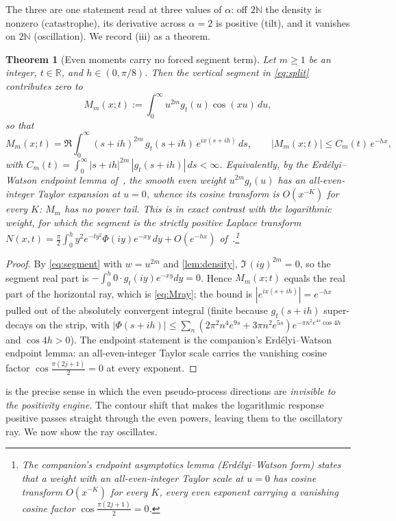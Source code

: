 \documentclass[11pt,reqno]{amsart}
\theoremstyle{plain}
\newtheorem{theorem}{Theorem}[section]
\theoremstyle{definition}
\theoremstyle{remark}
\newcommand{\R}{\mathbb R}
\newcommand{\N}{\mathbb N}
\begin{document}
The three are one statement read at three values of $\alpha$: off $2\N$ the
density is nonzero (catastrophe), its derivative across $\alpha=2$ is
positive (tilt), and it vanishes on $2\N$ (oscillation). We record (iii) as
a theorem.

\begin{theorem}[Even moments carry no forced segment term]
\label{thm:dichotomy}
Let $m\ge1$ be an integer, $t\in\R$, and $h\in(0,\pi/8)$. Then the vertical
segment in \eqref{eq:split} contributes zero to
\[
  M_m(x;t):=\int_0^\infty u^{2m}g_t(u)\cos(xu)\,du,
\]
so that
\begin{equation}\label{eq:Mray}
  M_m(x;t)=\Re\int_0^\infty (s+ih)^{2m}\,g_t(s+ih)\,e^{ix(s+ih)}\,ds,
  \qquad
  |M_m(x;t)|\le C_m(t)\,e^{-hx},
\end{equation}
with $C_m(t)=\int_0^\infty|s+ih|^{2m}\,|g_t(s+ih)|\,ds<\infty$. Equivalently,
by the Erd\'elyi--Watson endpoint lemma of~\cite{Fsymbol}, the smooth even
weight $u^{2m}g_t(u)$ has an all-even-integer Taylor expansion at $u=0$,
whence its cosine transform is $O(x^{-K})$ for every $K$: $M_m$ has no
power tail. This is in exact contrast with the logarithmic weight, for
which the segment is the strictly positive Laplace transform
$N(x,t)=\tfrac\pi2\int_0^h y^2e^{-ty^2}\Phi(iy)e^{-xy}\,dy+O(e^{-hx})$
of~\cite{Fsymbol}.\footnote{The companion's endpoint asymptotics lemma
(Erd\'elyi--Watson form) states that a weight with an all-even-integer
Taylor scale at $u=0$ has cosine transform $O(x^{-K})$ for every $K$, every
even exponent carrying a vanishing cosine factor $\cos\tfrac{\pi(2j+1)}2=0$.}
\end{theorem}

\begin{proof}
By \eqref{eq:segment} with $w=u^{2m}$ and \cref{lem:density},
$\Im\,(iy)^{2m}=0$, so the segment real part is
$-\int_0^h0\cdot g_t(iy)e^{-xy}dy=0$. Hence $M_m(x;t)$ equals the real part
of the horizontal ray, which is \eqref{eq:Mray}; the bound is
$|e^{ix(s+ih)}|=e^{-hx}$ pulled out of the absolutely convergent integral
(finite because $g_t(s+ih)$ super-decays on the strip, with
$|\Phi(s+ih)|\le\sum_n(2\pi^2n^4e^{9s}+3\pi n^2e^{5s})
e^{-\pi n^2e^{4s}\cos4h}$ and $\cos4h>0$). The endpoint statement is the
companion's Erd\'elyi--Watson endpoint lemma: an all-even-integer Taylor
scale carries the vanishing cosine factor $\cos\tfrac{\pi(2j+1)}2=0$ at
every exponent.
\end{proof}

 is the precise sense in which the even pseudo-process
directions are \emph{invisible to the positivity engine}. The contour shift
that makes the logarithmic response positive passes straight through the
even powers, leaving them to the oscillatory ray. We now show the ray
oscillates.
\end{document}
